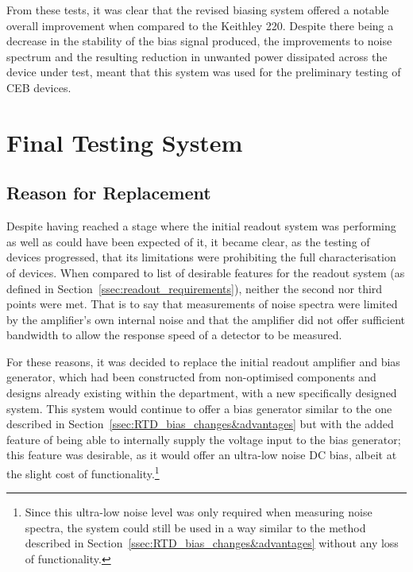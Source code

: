\par 
From these tests, it was clear that the revised biasing system offered a notable overall improvement when compared to the Keithley 220. Despite there being a decrease in the stability of the bias signal produced, the improvements to noise spectrum and the resulting reduction in unwanted power dissipated across the device under test, meant that this system was used for the preliminary testing of CEB devices.

\section{Final Testing System} \label{sec:Final_Readout}
\subsection{Reason for Replacement}\label{ssec:Final_Readout_Reasons}
Despite having reached a stage where the initial readout system was performing as well as could have been expected of it, it became clear, as the testing of devices progressed, that its limitations were prohibiting the full characterisation of devices. When compared to list of desirable features for the readout system (as defined in Section~\ref{ssec:readout_requirements}), neither the second nor third points were met. That is to say that measurements of noise spectra were limited by the amplifier's own internal noise and that the amplifier did not offer sufficient bandwidth to allow the response speed of a detector to be measured.
\par 
For these reasons, it was decided to replace the initial readout amplifier and bias generator, which had been constructed from non-optimised components and designs already existing within the department, with a new specifically designed system. This system would continue to offer a bias generator similar to the one described in Section~\ref{ssec:RTD_bias_changes&advantages} but with the added feature of being able to internally supply the voltage input to the bias generator; this feature was desirable, as it would offer an ultra-low noise DC bias, albeit at the slight cost of functionality.\footnote{Since this ultra-low noise level was only required when measuring noise spectra, the system could still be used in a way similar to the method described in Section~\ref{ssec:RTD_bias_changes&advantages} without any loss of functionality.}

